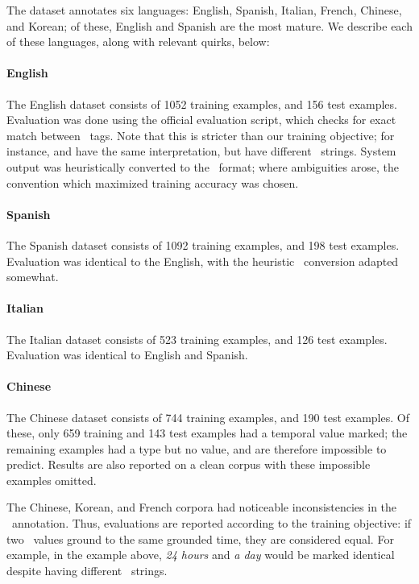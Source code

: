 The dataset annotates six languages:
  English, Spanish, Italian, French, Chinese, and Korean;
  of these, English and Spanish are the most mature.
We describe each of these languages, along with relevant quirks, below:

\paragraph{English}
The English dataset consists of 1052 training examples, and 156 test examples.
Evaluation was done using the official evaluation script, which checks for
  exact match between \timex\ tags.
Note that this is stricter than our training objective;
  for instance,  and  have the same interpretation, but
  have different \timex\ strings.
System output was heuristically converted to the \timex\ format; where
  ambiguities arose, the convention which maximized training accuracy was
  chosen.

\paragraph{Spanish}
The Spanish dataset consists of 1092 training examples, and 198 test examples.
Evaluation was identical to the English, with the heuristic \timex\ conversion
  adapted somewhat.

\paragraph{Italian}
The Italian dataset consists of 523 training examples, and 126 test examples.
Evaluation was identical to English and Spanish.

\paragraph{Chinese}
The Chinese dataset consists of 744 training examples, and 190 test examples.
Of these, only 659 training and 143 test examples had a temporal value marked;
  the remaining examples had a type but no value, and are therefore
  impossible to predict.
Results are also reported on a clean corpus with these impossible examples
  omitted.

The Chinese, Korean, and French corpora had noticeable
  inconsistencies in the \timex\ annotation.
Thus, evaluations are reported according to the training objective: if two
  \timex\ values ground to the same grounded time, they are considered equal.
For example, in the example above, \textit{24 hours} and \textit{a day}
  would be marked identical despite having different \timex\ strings.


